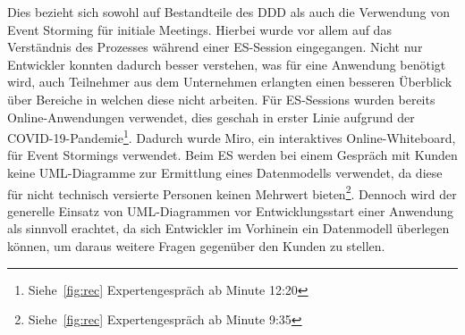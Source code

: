 Dies bezieht sich sowohl auf Bestandteile des \ac{DDD} als auch die Verwendung von Event Storming für initiale Meetings.
Hierbei wurde vor allem auf das Verständnis des Prozesses während einer \ac{ES}-Session eingegangen.
Nicht nur Entwickler konnten dadurch besser verstehen, was für eine Anwendung benötigt wird, auch Teilnehmer aus dem Unternehmen erlangten
einen besseren Überblick über Bereiche in welchen diese nicht arbeiten.\newline
Für \ac{ES}-Sessions wurden bereits Online-Anwendungen verwendet, dies geschah in erster Linie aufgrund der COVID-19-Pandemie\footnote{Siehe~\ref{fig:rec} Expertengespräch ab Minute  12:20}.
Dadurch wurde Miro, ein interaktives Online-Whiteboard, für Event Stormings verwendet.\newline
Beim \ac{ES} werden bei einem Gespräch mit Kunden keine UML-Diagramme zur Ermittlung eines Datenmodells verwendet,
da diese für nicht technisch versierte Personen keinen Mehrwert bieten\footnote{Siehe~\ref{fig:rec} Expertengespräch ab Minute  9:35}.
Dennoch wird der generelle Einsatz von UML-Diagrammen vor Entwicklungsstart einer Anwendung als sinnvoll erachtet,
da sich Entwickler im Vorhinein ein Datenmodell überlegen können, um daraus weitere Fragen gegenüber den Kunden zu stellen.

